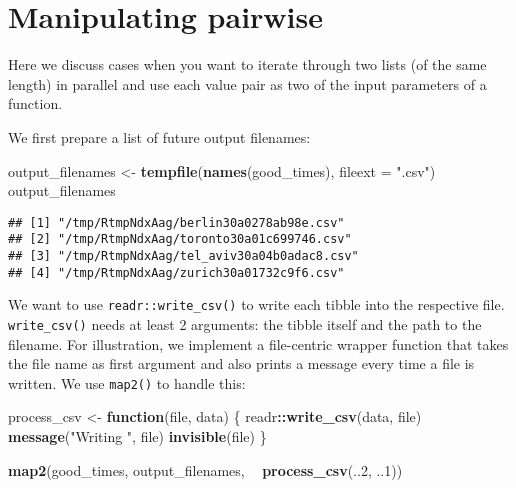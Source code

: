 \documentclass[]{book}
\newenvironment{Shaded}{\begin{snugshade}}{\end{snugshade}}
\newcommand{\ControlFlowTok}[1]{\textcolor[rgb]{0.13,0.29,0.53}{\textbf{#1}}}
\newcommand{\DataTypeTok}[1]{\textcolor[rgb]{0.13,0.29,0.53}{#1}}
\newcommand{\DecValTok}[1]{\textcolor[rgb]{0.00,0.00,0.81}{#1}}
\newcommand{\KeywordTok}[1]{\textcolor[rgb]{0.13,0.29,0.53}{\textbf{#1}}}
\newcommand{\NormalTok}[1]{#1}
\newcommand{\OperatorTok}[1]{\textcolor[rgb]{0.81,0.36,0.00}{\textbf{#1}}}
\newcommand{\StringTok}[1]{\textcolor[rgb]{0.31,0.60,0.02}{#1}}
\begin{document}
\hypertarget{manipulating-pairwise}{%
\section{Manipulating pairwise}\label{manipulating-pairwise}}

Here we discuss cases when you want to iterate through two lists (of the same length) in parallel and use each value pair as two of the input parameters of a function.

We first prepare a list of future output filenames:

\begin{Shaded}
\begin{Highlighting}[]
\NormalTok{output_filenames <-}\StringTok{ }\KeywordTok{tempfile}\NormalTok{(}\KeywordTok{names}\NormalTok{(good_times), }\DataTypeTok{fileext =} \StringTok{".csv"}\NormalTok{)}
\NormalTok{output_filenames}
\end{Highlighting}
\end{Shaded}

\begin{verbatim}
## [1] "/tmp/RtmpNdxAag/berlin30a0278ab98e.csv"  
## [2] "/tmp/RtmpNdxAag/toronto30a01c699746.csv" 
## [3] "/tmp/RtmpNdxAag/tel_aviv30a04b0adac8.csv"
## [4] "/tmp/RtmpNdxAag/zurich30a01732c9f6.csv"
\end{verbatim}

We want to use \texttt{readr::write\_csv()} to write each tibble into the respective file.
\texttt{write\_csv()} needs at least 2 arguments: the tibble itself and the path to the filename.
For illustration, we implement a file-centric wrapper function that takes the file name as first argument and also prints a message every time a file is written.
We use \texttt{map2()} to handle this:

\begin{Shaded}
\begin{Highlighting}[]
\NormalTok{process_csv <-}\StringTok{ }\ControlFlowTok{function}\NormalTok{(file, data) \{}
\NormalTok{  readr}\OperatorTok{::}\KeywordTok{write_csv}\NormalTok{(data, file)}
  \KeywordTok{message}\NormalTok{(}\StringTok{"Writing "}\NormalTok{, file)}
  \KeywordTok{invisible}\NormalTok{(file)}
\NormalTok{\}}

\KeywordTok{map2}\NormalTok{(good_times, output_filenames, }\OperatorTok{~}\StringTok{ }\KeywordTok{process_csv}\NormalTok{(..}\DecValTok{2}\NormalTok{, ..}\DecValTok{1}\NormalTok{))}
\end{Highlighting}
\end{Shaded}
\end{document}

